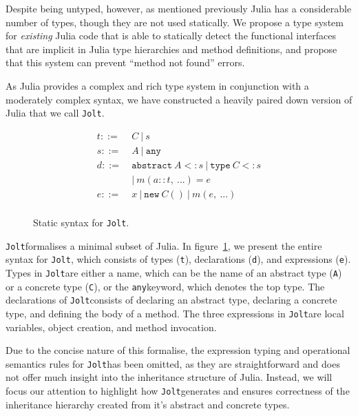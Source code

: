 \documentclass[preprint]{sigplanconf}
\newcommand{\xt}[1]{\texttt{#1}}
\newcommand{\abstype}[2]{\xt{abstract}~#1 <: #2}
\newcommand{\oftype}[2]{#1::#2}
\newcommand{\m}[2]{{#1}(#2)}
\newcommand{\contype}[2]{\xt{type}~#1 <: #2}
\newcommand{\any}{\xt{any}}
\newcommand{\jolt}{\xt{Jolt}}
\renewcommand{\ldots}{...}
\begin{document}
Despite being untyped, however, as mentioned previously Julia has a considerable
number of types, though they are not used statically. We propose a type system
for \emph{existing} Julia code that is able to statically detect the functional
interfaces that are implicit in Julia type hierarchies and method definitions,
and propose that this system can prevent ``method not found'' errors.

As Julia provides a complex and rich type system in conjunction with a moderately
complex syntax, we have constructed a heavily paired down version of Julia that we call \jolt.

\begin{figure}
\begin{align*}
t ::=~&  C ~|~ s\\
s ::=~& A ~|~ \any\\
d ::=~& \abstype{A}{s} ~|~ \contype{C}{s} \\
  & |~ \m{m}{\oftype{a}{t}, ~\ldots} = e\\
e ::=~& x ~|~ \xt{new} ~ C() ~|~ m(e,~\ldots) \\
\end{align*}
\caption{Static syntax for \jolt.}
\label{fm:syntax}
\end{figure}

\jolt\space formalises a minimal subset of Julia. In figure~\ref{fm:syntax}, we present the entire
syntax for \jolt, which consists of types (\xt{t}), declarations (\xt{d}), and expressions (\xt{e}). 
Types in \jolt\space are either a name, which can be the name of an abstract type (\xt{A}) or a concrete type (\xt{C}), 
or the \any\space keyword, which denotes the top type. The declarations 
of \jolt\space consists of declaring an abstract type, declaring a concrete type, and defining the body of a method.
The three expressions in \jolt\space are local variables, object creation, and method invocation. 

Due to the concise nature of this formalise, the expression typing and operational semantics rules for \jolt has
been omitted, as they are straightforward and does not offer much insight into the inheritance structure of Julia. 
Instead, we will focus our attention to highlight how \jolt\space generates and ensures correctness of the inheritance
hierarchy created from it's abstract and concrete types. 
\end{document}
